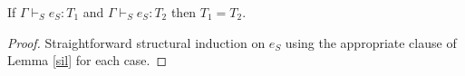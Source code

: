 \begin{suot}
\label{suot}
If $\Gamma\vdash_{S}e_{S}:T_{1}$ and $\Gamma\vdash_{S}e_{S}:T_{2}$ then $T_{1}=T_{2}$.
\begin{proof}
Straightforward structural induction on $e_{S}$ using the appropriate clause of Lemma \ref{sil} for each case.
\end{proof}
\end{suot}